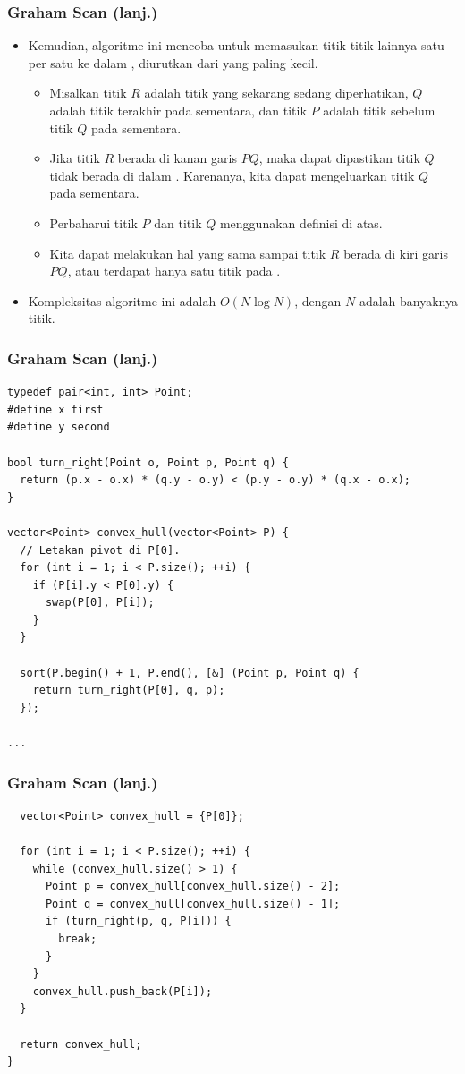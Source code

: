 \begin{frame}
\frametitle{Graham Scan (lanj.)}
\begin{itemize}
  \item Kemudian, algoritme ini mencoba untuk memasukan titik-titik lainnya satu per satu ke dalam \fconvexHull, diurutkan dari yang paling kecil.
  \begin{itemize}
    \item Misalkan titik $R$ adalah titik yang sekarang sedang diperhatikan, $Q$ adalah titik terakhir pada \fconvexHull sementara, dan titik $P$ adalah titik sebelum titik $Q$ pada \fconvexHull sementara.
    \item Jika titik $R$ berada di kanan garis $PQ$, maka dapat dipastikan titik $Q$ tidak berada di dalam \fconvexHull. Karenanya, kita dapat mengeluarkan titik $Q$ pada \fconvexHull sementara.
    \item Perbaharui titik $P$ dan titik $Q$ menggunakan definisi di atas.
    \item Kita dapat melakukan hal yang sama sampai titik $R$ berada di kiri garis $PQ$, atau terdapat hanya satu titik pada \fconvexHull.
  \end{itemize}
  \item Kompleksitas algoritme ini adalah $O(N \log N)$, dengan $N$ adalah banyaknya titik.
\end{itemize}
\end{frame}

\begin{frame}[fragile]
\frametitle{Graham Scan (lanj.)}
\begin{lstlisting}
typedef pair<int, int> Point;
#define x first
#define y second

bool turn_right(Point o, Point p, Point q) {
  return (p.x - o.x) * (q.y - o.y) < (p.y - o.y) * (q.x - o.x);
}

vector<Point> convex_hull(vector<Point> P) {
  // Letakan pivot di P[0].
  for (int i = 1; i < P.size(); ++i) {
    if (P[i].y < P[0].y) {
      swap(P[0], P[i]);
    }
  }

  sort(P.begin() + 1, P.end(), [&] (Point p, Point q) {
    return turn_right(P[0], q, p);
  });

...
\end{lstlisting}
\end{frame}

\begin{frame}[fragile]
\frametitle{Graham Scan (lanj.)}
\begin{lstlisting}
  vector<Point> convex_hull = {P[0]};

  for (int i = 1; i < P.size(); ++i) {
    while (convex_hull.size() > 1) {
      Point p = convex_hull[convex_hull.size() - 2];
      Point q = convex_hull[convex_hull.size() - 1];
      if (turn_right(p, q, P[i])) {
        break;
      }
    }
    convex_hull.push_back(P[i]);
  }

  return convex_hull;
}
\end{lstlisting}
\end{frame}

